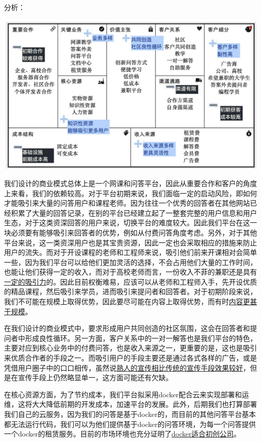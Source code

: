 \documentclass[a4paper]{ctexart}
\begin{document}
分析：
\begin{center}
  \includegraphics[scale=0.3]{总体评估.png}
\end{center}
我们设计的商业模式总体上是一个网课和问答平台，因此从重要合作和客户的角度上来看，我们的依赖较高。对于平台初期来说，我们面临一定的启动风险，即如何才能吸引来大量的问答用户和课程老师。因为往往一个优秀的回答者在其他网站已经积累了大量的回答记录，在别的平台已经建立起了一整套完整的用户信息和用户生态，对于这类资深回答的用户来说，切换平台的难度较大。因此我们平台在这一块必须要有能够吸引来回答者的优势，例如从付费问答角度考虑。另外，对于其他平台来说，这一类资深用户也是其宝贵资源，因此一定也会采取相应的措施来防止用户的流失。而对于开设课程的老师和工程师来说，吸引他们前来开课相对会简单一些，因为我们平台可以给他们更加灵活的选择，不会占用他们大量的工作时间，也能让他们获得一定的收入，而对于高校老师而言，一份收入不菲的兼职还是具有\href{https://new.qq.com/omn/20190613/20190613A06C5P.html}{一定的吸引力}的。因此目前权衡难易，应该可以从老师和工程师入手，先开设优质的精品课程，然后吸引来学员，进而吸引来提问者和回答者。对于初期阶段来说，我们不可能在规模上取得优势，因此要尽可能在内容上取得优势，而有时\href{https://www.tmtpost.com/42868.html}{内容更甚于规模}。

在我们设计的商业模式中，要求形成用户共同创造的社区氛围，这会在回答者和提问者中形成良性循环。另一方面，客户关系中的一对一解答也是我们平台的特色，主要对应到核心业务中的付费问答，也是收入来源之一，更重要的是，这也是吸引来优质合作者的手段之一。而吸引用户的手段主要还是通过各式各样的广告，或是凭借用户圈子中的口口相传，虽然说\href{https://wiki.mbalib.com/wiki/%E7%86%9F%E4%BA%BA%E7%BB%8F%E6%B5%8E}{熟人的宣传相比传统的宣传手段效果较好}，但是在宣传手段上仍然略显单一，这方面可能还有欠缺。

在核心资源方面，为了节约成本，我们平台拟采用docker配合云来实现部署和运维，这将大大降低前期的开发成本，加速平台的发展。此外，后期我们也打算部署我们自己的云服务，因为我们的问答是基于docker的，而目前的其他问答平台基本都无法运行代码，我们可以为他们提供基于docker的问答环境，为每一个问答提供一个docker的租赁服务。目前的市场环境也充分证明了\href{https://www.jianshu.com/p/553b35e0fc82}{docker适合初创公司}。
\end{document}
